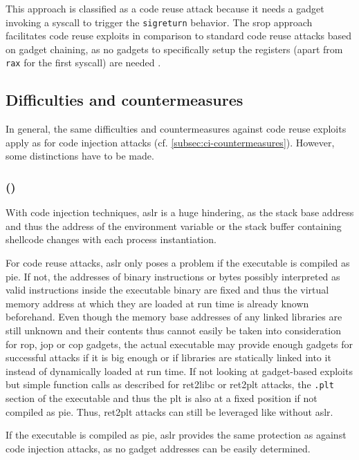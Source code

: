 This approach is classified as a code reuse attack because it needs a gadget invoking a \gls{syscall} to trigger the \texttt{sigreturn} behavior.
The \gls{srop} approach facilitates code reuse exploits in comparison to standard code reuse attacks based on gadget chaining, as no gadgets to specifically setup the registers (apart from \texttt{rax} for the first \gls{syscall}) are needed \cite{Bosman2014}.

\subsection{Difficulties and countermeasures}
\label{subsec:cr-countermeasures}

In general, the same difficulties and countermeasures against code reuse exploits apply as for code injection attacks (cf. \cref{subsec:ci-countermeasures}).
However, some distinctions have to be made.

\subsubsection{ ()}
\label{subsubsec:cr-aslr}

With code injection techniques, \gls{aslr} is a huge hindering, as the stack base address and thus the address of the environment variable or the stack buffer containing shellcode changes with each process instantiation.

For code reuse attacks, \gls{aslr} only poses a problem if the executable is compiled as \gls{pie}.
If not, the addresses of binary instructions or bytes possibly interpreted as valid instructions inside the executable binary are fixed and thus the virtual memory address at which they are loaded at run time is already known beforehand.
Even though the memory base addresses of any linked libraries are still unknown and their contents thus cannot easily be taken into consideration for \gls{rop}, \gls{jop} or \gls{cop} gadgets, the actual executable may provide enough gadgets for successful attacks if it is big enough or if libraries are statically linked into it instead of dynamically loaded at run time.
If not looking at gadget-based exploits but simple function calls as described for \gls{ret2libc} or \gls{ret2plt} attacks, the \texttt{.plt} section of the executable and thus the \gls{plt} is also at a fixed position if not compiled as \gls{pie}.
Thus, \gls{ret2plt} attacks can still be leveraged like without \gls{aslr}.

If the executable is compiled as \gls{pie}, \gls{aslr} provides the same protection as against code injection attacks, as no gadget addresses can be easily determined.

